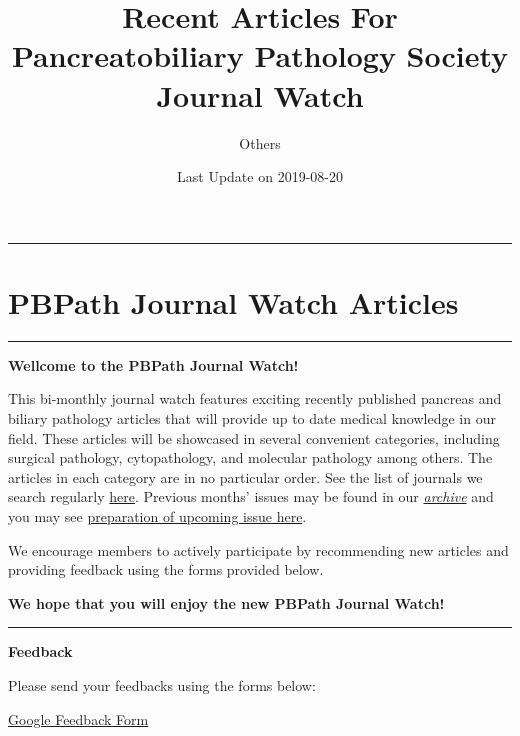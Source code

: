 \documentclass[]{article}
\title{Recent Articles For Pancreatobiliary Pathology Society Journal Watch}
\subtitle{Others}
\author{}
\date{Last Update on 2019-08-20}
\begin{document}
\maketitle

{
\setcounter{tocdepth}{5}
\tableofcontents
}
\begin{center}\rule{0.5\linewidth}{\linethickness}\end{center}

\hypertarget{pbpath-journal-watch-articles}{%
\section{PBPath Journal Watch
Articles}\label{pbpath-journal-watch-articles}}

\begin{center}\rule{0.5\linewidth}{\linethickness}\end{center}

\textbf{Wellcome to the PBPath Journal Watch!}

This bi-monthly journal watch features exciting recently published
pancreas and biliary pathology articles that will provide up to date
medical knowledge in our field. These articles will be showcased in
several convenient categories, including surgical pathology,
cytopathology, and molecular pathology among others. The articles in
each category are in no particular order. See the list of journals we
search regularly \href{http://pbpath.org/pbpath-journal-watch/}{here}.
Previous months' issues may be found in our
\emph{\href{http://pbpath.org/journal-watch-archive/}{archive}} and you
may see
\href{http://pbpath.org/journal-watch-upcoming-issue/}{preparation of
upcoming issue here}.

We encourage members to actively participate by recommending new
articles and providing feedback using the forms provided below.

\textbf{We hope that you will enjoy the new PBPath Journal Watch!}

\begin{center}\rule{0.5\linewidth}{\linethickness}\end{center}

\textbf{Feedback}

Please send your feedbacks using the forms below:

\href{https://docs.google.com/forms/d/e/1FAIpQLSeD3Z9J6Y7eMmiyM12f_SfAmHUlykb1zxZcwO6lg7cebGYQIQ/viewform}{Google
Feedback Form}

\hypertarget{disqus_thread}{}
\end{document}
